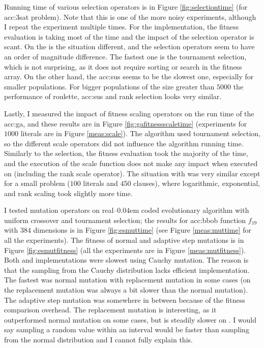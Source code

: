 Running time of various selection operators is in Figure \ref{fig:selectiontime} (for \acrshort{acc:3sat} problem). Note that this is one of the more noisy experiments, although I repeat the experiment multiple times. For the \cpu implementation, the fitness evaluation is taking most of the time and the impact of the selection operator is scant. On the \gpu is the situation different, and the selection operators seem to have an order of magnitude difference. The fastest one is the tournament selection, which is not surprising, as it does not require sorting or search in the fitness array. On the other hand, the \acrshort{acc:sus} seems to be the slowest one, especially for smaller populations. For bigger populations of the size greater than $5000$ the performance of roulette, \acrshort{acc:sus} and rank selection looks very similar.

Lastly, I measured the impact of fitness scaling operators on the run time of the \acrshort{acc:ga}, and these results are in Figure \ref{fig:gafitnessscaletime} (experiments for $1000$ literals are in Figure \ref{meas:scale}). The algorithm used tournament selection, so the different scale operators did not influence the algorithm running time. Similarly to the selection, the fitness evaluation took the majority of the time, and the execution of the scale function does not make any impact when executed on \cpu (including the rank scale operator). The situation with \gpu was very similar except for a small problem ($100$ literals and $450$ clauses), where logarithmic, exponential, and rank scaling took slightly more time.

I tested mutation operators on real--\kern0.04em coded evolutionary algorithm with uniform crossover and tournament selection; the results for \acrshort{acc:bbob} function $f_{19}$ with $384$ dimensions is in Figure \ref{fig:esmuttime} (see Figure \ref{meas:muttime} for all the experiments). The fitness of normal and adaptive step mutations is in Figure \ref{fig:esmutfitness} (all the experiments are in Figure \ref{meas:mutfitness}). Both \cpu and \gpu implementations were slowest using Cauchy mutation. The reason is that the sampling from the Cauchy distribution lacks efficient implementation. The fastest was normal mutation with replacement mutation in some \gpu cases (on \cpu the replacement mutation was always a bit slower than the normal mutation). The adaptive step mutation was somewhere in between because of the fitness comparison overhead. The replacement mutation is interesting, as it outperformed normal mutation on some \gpu cases, but is steadily slower on \cpuns. I would say sampling a random value within an interval would be faster than sampling from the normal distribution and I cannot fully explain this.

